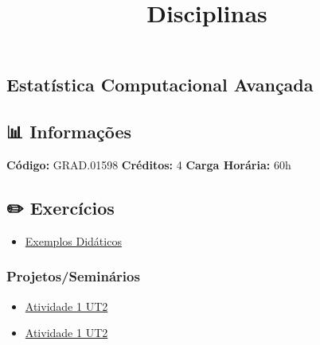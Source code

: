 \documentclass[
  letterpaper,
  DIV=11,
  numbers=noendperiod]{scrartcl}
\title{Disciplinas}
\author{}
\date{}
\providecommand{\tightlist}{%
  \setlength{\itemsep}{0pt}\setlength{\parskip}{0pt}}
\begin{document}
\maketitle


\subsection{Estatística Computacional
Avançada}\label{estatuxedstica-computacional-avanuxe7ada}

\subsection{📊 Informações}

\textbf{Código:} GRAD.01598\textbar{} \textbf{Créditos:} 4 \textbar{}
\textbf{Carga Horária:} 60h

\subsection{✏️ Exercícios}

\begin{itemize}
\tightlist
\item
  \href{https://github.com/ValdeniseNS/estatistica_computacional}{Exemplos
  Didáticos}
\end{itemize}

\subsubsection{Projetos/Seminários}\label{projetosseminuxe1rios}

\begin{itemize}
\tightlist
\item
  \href{https://github.com/ValdeniseNS/estatistica_computacional/blob/main/Atividade1UT2.Rmd}{Atividade
  1 UT2}
\item
  \href{https://github.com/ValdeniseNS/estatistica_computacional/blob/main/Atividade2UT2.Rmd}{Atividade
  1 UT2}
\end{itemize}
\end{document}
